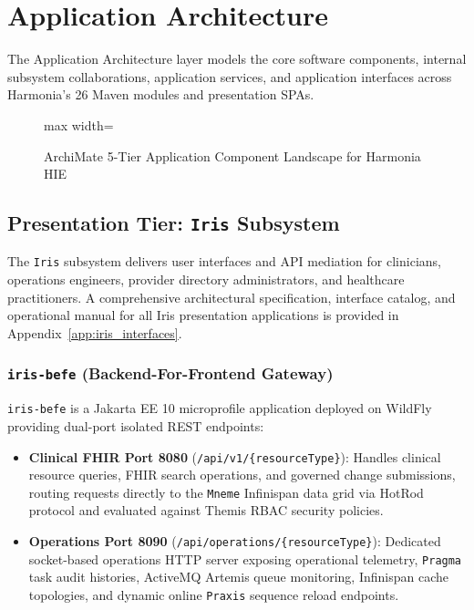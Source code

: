 
\chapter{Application Architecture}
\label{chap:application_layer}

The Application Architecture layer models the core software components, internal subsystem collaborations, application services, and application interfaces across Harmonia's 26 Maven modules and presentation SPAs.

\begin{figure}[htbp]
    \centering
    \begin{adjustbox}{max width=\textwidth}
        
    \end{adjustbox}
    \caption{ArchiMate 5-Tier Application Component Landscape for Harmonia HIE}
    \label{fig:app_overview_5tier}
\end{figure}

\section{Presentation Tier: \texttt{Iris} Subsystem}
\label{sec:app_iris_tier}

The \texttt{Iris} subsystem delivers user interfaces and API mediation for clinicians, operations engineers, provider directory administrators, and healthcare practitioners. A comprehensive architectural specification, interface catalog, and operational manual for all Iris presentation applications is provided in Appendix~\ref{app:iris_interfaces}.

\subsection{\texttt{iris-befe} (Backend-For-Frontend Gateway)}
\texttt{iris-befe} is a Jakarta EE 10 microprofile application deployed on WildFly providing dual-port isolated REST endpoints:
\begin{itemize}
    \item \textbf{Clinical FHIR Port 8080} (\texttt{/api/v1/\{resourceType\}}): Handles clinical resource queries, FHIR search operations, and governed change submissions, routing requests directly to the \texttt{Mneme} Infinispan data grid via HotRod protocol and evaluated against Themis RBAC security policies.
    \item \textbf{Operations Port 8090} (\texttt{/api/operations/\{resourceType\}}): Dedicated socket-based operations HTTP server exposing operational telemetry, \texttt{Pragma} task audit histories, ActiveMQ Artemis queue monitoring, Infinispan cache topologies, and dynamic online \texttt{Praxis} sequence reload endpoints.
\end{itemize}

